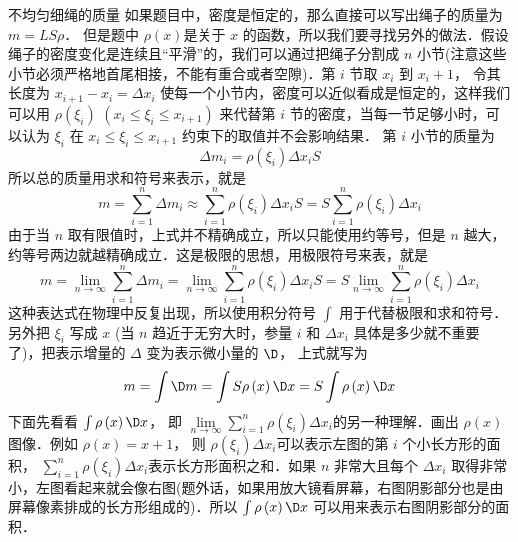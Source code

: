 \begin{exam}{不均匀细绳的质量}
如果题目中，密度是恒定的，那么直接可以写出绳子的质量为 $m = LS\rho$． 但是题中 $\rho(x)$是关于 $x$ 的函数，所以我们要寻找另外的做法．假设绳子的密度变化是连续且“平滑”的，我们可以通过把绳子分割成 $n$ 小节(注意这些小节必须严格地首尾相接，不能有重合或者空隙)．第 $i$ 节取 $x_i$ 到 $x_i +1$， 令其长度为 $x_{i + 1} - {x_i} = \Delta x_i$ 使每一个小节内，密度可以近似看成是恒定的，这样我们可以用 $\rho(\xi _i)\,\, (x_i \le \xi _i \le x_{i + 1})$ 来代替第 $i$ 节的密度，当每一节足够小时，可以认为 ${\xi _i}$ 在 ${x_i} \le {\xi _i} \le {x_{i + 1}}$ 约束下的取值并不会影响结果．
第 $i$ 小节的质量为
\begin{equation}
\Delta {m_i} = \rho \left( {{\xi _i}} \right)\Delta {x_i}S 
\end{equation}
所以总的质量用求和符号来表示，就是
\begin{equation}
m = \sum\limits_{i = 1}^n {\Delta {m_i}}  \approx \sum\limits_{i = 1}^n {\rho \left( {{\xi _i}} \right)\Delta {x_i}S  }  = S \sum\limits_{i = 1}^n {\rho \left( {{\xi _i}} \right)\Delta {x_i} } 
\end{equation}
由于当 $n$ 取有限值时，上式并不精确成立，所以只能使用约等号，但是 $n$ 越大，约等号两边就越精确成立．这是极限的思想，用极限符号来表，就是
\begin{equation}
m = \mathop {\lim }\limits_{n \to \infty } \sum\limits_{i = 1}^n {\Delta {m_i}}  = \mathop {\lim }\limits_{n \to \infty } \sum\limits_{i = 1}^n {\rho \left( {{\xi _i}} \right)\Delta {x_i}S  }  = S   \mathop {\lim }\limits_{n \to \infty } \sum\limits_{i = 1}^n {\rho \left( {{\xi _i}} \right)\Delta {x_i} } 
\end{equation}
这种表达式在物理中反复出现，所以使用积分符号 $\int {} $ 用于代替极限和求和符号．另外把 ${\xi _i}$ 写成 $x$ (当 $n$ 趋近于无穷大时，参量 $i$ 和 $\Delta {x_i}$ 具体是多少就不重要了)，把表示增量的 $\Delta $ 变为表示微小量的 $\D$， 上式就写为
\begin{equation}
m = \int {\D m}  = \int {S\rho \left( x \right)\D x}  = S\int {\rho \left( x \right)\D x} 
\end{equation}
下面先看看 $\int {\rho \left( x \right)\D x} $， 即 $\mathop {\lim }\limits_{n \to \infty } \sum\limits_{i = 1}^n {\rho \left( {{\xi _i}} \right)\Delta {x_i} } $的另一种理解．画出 $\rho (x)$图像．例如 $\rho \left( x \right) = x + 1$， 则 $\rho \left( {{\xi _i}} \right)\Delta {x_i}$可以表示左图的第 $i$ 个小长方形的面积， $\sum\limits_{i = 1}^n {\rho \left( {{\xi _i}} \right)\Delta {x_i} } $表示长方形面积之和．如果 $n$ 非常大且每个 $\Delta {x_i}$ 取得非常小，左图看起来就会像右图(题外话，如果用放大镜看屏幕，右图阴影部分也是由屏幕像素排成的长方形组成的)．所以 $\int {\rho \left( x \right)\D x} $ 可以用来表示右图阴影部分的面积．


\end{exam}
